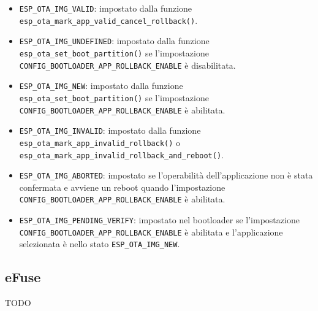\documentclass[a4paper]{article}
\begin{document}
\begin{itemize}
  \item \texttt{ESP\_OTA\_IMG\_VALID}: impostato dalla funzione \\
    \texttt{esp\_ota\_mark\_app\_valid\_cancel\_rollback()}.

  \item \texttt{ESP\_OTA\_IMG\_UNDEFINED}: impostato dalla funzione \\
    \texttt{esp\_ota\_set\_boot\_partition()} se l'impostazione \\
    \texttt{CONFIG\_BOOTLOADER\_APP\_ROLLBACK\_ENABLE} è disabilitata.

  \item \texttt{ESP\_OTA\_IMG\_NEW}: impostato dalla funzione \\
    \texttt{esp\_ota\_set\_boot\_partition()} se l'impostazione \\
    \texttt{CONFIG\_BOOTLOADER\_APP\_ROLLBACK\_ENABLE} è abilitata.

  \item \texttt{ESP\_OTA\_IMG\_INVALID}: impostato dalla funzione \\
    \texttt{esp\_ota\_mark\_app\_invalid\_rollback()} o \\
    \texttt{esp\_ota\_mark\_app\_invalid\_rollback\_and\_reboot()}.

  \item \texttt{ESP\_OTA\_IMG\_ABORTED}: impostato se l'operabilità dell'applicazione non
    è stata confermata e avviene un reboot quando l'impostazione \\
    \texttt{CONFIG\_BOOTLOADER\_APP\_ROLLBACK\_ENABLE} è abilitata.

  \item \texttt{ESP\_OTA\_IMG\_PENDING\_VERIFY}: impostato nel bootloader se l'impostazione \\
    \texttt{CONFIG\_BOOTLOADER\_APP\_ROLLBACK\_ENABLE} è abilitata e l'applicazione
    selezionata è nello stato \texttt{ESP\_OTA\_IMG\_NEW}.
\end{itemize}

\subsection{eFuse}
TODO
\end{document}
